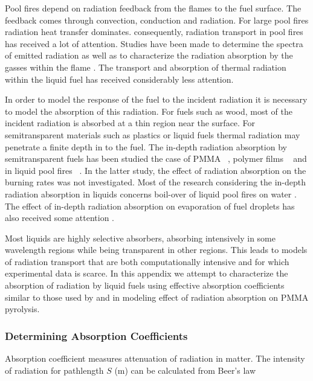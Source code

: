 Pool fires depend on radiation feedback from the flames to the fuel surface. The feedback comes through convection, conduction and radiation. For large pool fires radiation heat transfer dominates. consequently, radiation transport in pool fires has received a lot of attention. Studies have been made to determine the spectra of emitted radiation \cite{Suo-Anttila:PCT2009} as well as to characterize the radiation absorption by the gasses within the flame \cite{Wakatsuki:CST2008}. The transport and absorption of thermal radiation within the liquid fuel has received considerably less attention.

In order to model the response of the fuel to the incident radiation it is necessary to model the absorption of this radiation. For fuels such as wood, most of the incident radiation is absorbed at a thin region near the surface. For semitransparent materials such as plastics or liquid fuels thermal radiation may penetrate a finite depth in to the fuel.  The in-depth radiation absorption by semitransparent fuels has been studied the case of PMMA ~\cite{Stoliarov:CF2009}, polymer films ~\cite{Tsilingiris:ECM2003} and in liquid pool fires ~\cite{Suo-Anttila:PCT2009}.  In the latter study, the effect of radiation absorption on the burning rates was not investigated.  Most of the research considering the in-depth radiation absorption in liquids concerns boil-over of liquid pool fires on water \cite{Broeckmann:JLPPI1995}. The effect of in-depth radiation absorption on evaporation of fuel droplets has also received some attention \cite{Sazhin:IJHMT2004b}.

Most liquids are highly selective absorbers, absorbing intensively in some wavelength regions while being transparent in other regions.  This leads to models of radiation transport that are both computationally intensive and for which experimental data is scarce. In this appendix we attempt to characterize the absorption of radiation by liquid fuels using effective absorption coefficients similar to those used by \cite{Madhav:IJMP1995} and \cite{Manohar:JHT1995} in modeling effect of radiation absorption on PMMA pyrolysis.

\subsubsection{Determining Absorption Coefficients}

Absorption coefficient measures attenuation of radiation in matter.  The intensity of radiation for pathlength $S$ (m) can be calculated from Beer's law

